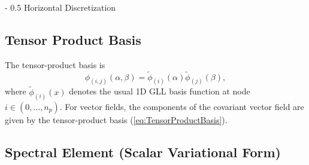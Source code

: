\documentclass{article}
\makeatletter
\renewcommand\section{\@startsection
  {section}{2}{0mm}%
  {-\baselineskip}%
  {0.5\baselineskip}%
  {\normalfont\Huge\bfseries}}%
\makeatother
\begin{document}
\section{Horizontal Discretization}

\subsection{Tensor Product Basis}

The tensor-product basis is
\begin{equation} \label{eq:TensorProductBasis}
\phi_{(i,j)}(\alpha, \beta) = \tilde{\phi}_{(i)}(\alpha) \tilde{\phi}_{(j)}(\beta),
\end{equation} where $\tilde{\phi}_{(i)}(x)$ denotes the usual 1D GLL basis function at node $i \in (0, \ldots, n_p)$.  For vector fields, the components of the covariant vector field are given by the tensor-product basis (\ref{eq:TensorProductBasis}).

\subsection{Spectral Element (Scalar Variational Form)}
\end{document}
